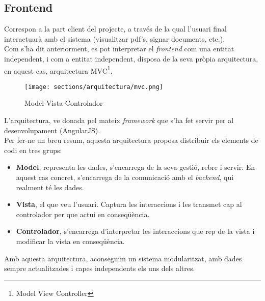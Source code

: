 \subsection{Frontend}
\label{arquitecura:global_frontend}
Correspon a la part client del projecte, a través de la qual l'usuari final interactuarà amb el sistema (visualitzar pdf's, signar documents, etc.).\\
Com s'ha dit anteriorment, es pot interpretar el \textit{frontend} com una entitat independent, i com a entitat independent, disposa de la seva pròpia arquitectura, en aquest cas, arquitectura MVC\footnote{Model View Controller}.
\begin{figure}[h]
\texttt{[image: sections/arquitectura/mvc.png]}
\centering
\caption{Model-Vista-Controlador}
\label{fig:arquitectura_mvc}
\end{figure}
\newline L'arquitectura, ve donada pel mateix \textit{framework} que s'ha fet servir per al desenvolupament  (AngularJS).\\
\newline Per fer-ne un breu resum, aquesta arquitectura proposa distribuir els elements de codi en tres grups:
\begin{itemize}
    \item \textbf{Model}, representa les dades, s'encarrega de la seva gestió, rebre i servir. En aquest cas concret, s'encarrega de la comunicació amb el \textit{backend}, qui realment té les dades.
    \item \textbf{Vista}, el que veu l'usuari. Captura les interaccions i les transmet cap al controlador per que actui en conseqüència.
    \item \textbf{Controlador}, s'encarrega d'interpretar les interaccions que rep de la vista i modificar la vista en conseqüència.
\end{itemize}
Amb aquesta arquitectura, aconseguim un sistema modularitzat, amb dades sempre actualitzades i capes independents els uns dels altres.
\clearpage
